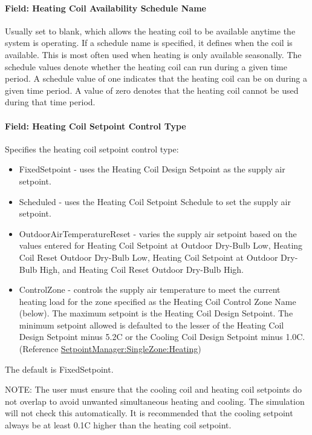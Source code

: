 \paragraph{Field: Heating Coil Availability Schedule Name}\label{field-heating-coil-availability-schedule-name-6}

Usually set to blank, which allows the heating coil to be available anytime the system is operating. If a schedule name is specified, it defines when the coil is available. This is most often used when heating is only available seasonally. The schedule values denote whether the heating coil can run during a given time period. A schedule value of one indicates that the heating coil can be on during a given time period. A value of zero denotes that the heating coil cannot be used during that time period.

\paragraph{Field: Heating Coil Setpoint Control Type}\label{field-heating-coil-setpoint-control-type}

Specifies the heating coil setpoint control type:

\begin{itemize}
\item
  FixedSetpoint - uses the Heating Coil Design Setpoint as the supply air setpoint.
\item
  Scheduled - uses the Heating Coil Setpoint Schedule to set the supply air setpoint.
\item
  OutdoorAirTemperatureReset - varies the supply air setpoint based on the values entered for Heating Coil Setpoint at Outdoor Dry-Bulb Low, Heating Coil Reset Outdoor Dry-Bulb Low, Heating Coil Setpoint at Outdoor Dry-Bulb High, and Heating Coil Reset Outdoor Dry-Bulb High.
\item
  ControlZone - controls the supply air temperature to meet the current heating load for the zone specified as the Heating Coil Control Zone Name (below). The maximum setpoint is the Heating Coil Design Setpoint. The minimum setpoint allowed is defaulted to the lesser of the Heating Coil Design Setpoint minus 5.2C or the Cooling Coil Design Setpoint minus 1.0C. (Reference \hyperref[setpointmanagersinglezoneheating]{SetpointManager:SingleZone:Heating})
\end{itemize}

The default is FixedSetpoint.

NOTE: The user must ensure that the cooling coil and heating coil setpoints do not overlap to avoid unwanted simultaneous heating and cooling. The simulation will not check this automatically. It is recommended that the cooling setpoint always be at least 0.1C higher than the heating coil setpoint.

